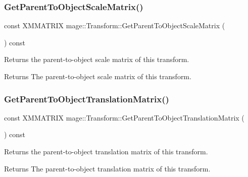 \subsubsection{\texorpdfstring{Get\+Parent\+To\+Object\+Scale\+Matrix()}{GetParentToObjectScaleMatrix()}}
{\footnotesize\ttfamily const X\+M\+M\+A\+T\+R\+IX mage\+::\+Transform\+::\+Get\+Parent\+To\+Object\+Scale\+Matrix (\begin{DoxyParamCaption}{ }\end{DoxyParamCaption}) const\hspace{0.3cm}{\ttfamily [noexcept]}}

Returns the parent-\/to-\/object scale matrix of this transform.

\begin{DoxyReturn}{Returns}
The parent-\/to-\/object scale matrix of this transform. 
\end{DoxyReturn}
\hypertarget{classmage_1_1_transform_abc1bf609a4fc988ca8299ac4c67e4b25}{}\label{classmage_1_1_transform_abc1bf609a4fc988ca8299ac4c67e4b25} 
\subsubsection{\texorpdfstring{Get\+Parent\+To\+Object\+Translation\+Matrix()}{GetParentToObjectTranslationMatrix()}}
{\footnotesize\ttfamily const X\+M\+M\+A\+T\+R\+IX mage\+::\+Transform\+::\+Get\+Parent\+To\+Object\+Translation\+Matrix (\begin{DoxyParamCaption}{ }\end{DoxyParamCaption}) const\hspace{0.3cm}{\ttfamily [noexcept]}}

Returns the parent-\/to-\/object translation matrix of this transform.

\begin{DoxyReturn}{Returns}
The parent-\/to-\/object translation matrix of this transform. 
\end{DoxyReturn}
\hypertarget{classmage_1_1_transform_a4e133167aaded2194cb16eaa30ace40b}{}\label{classmage_1_1_transform_a4e133167aaded2194cb16eaa30ace40b} 

